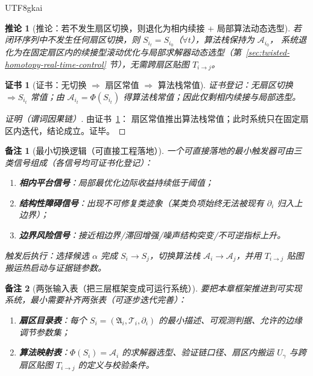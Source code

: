 \documentclass[12pt]{article}
\newtheorem{corollary}{推论}[section]
\newtheorem{remark}{备注}[section]
\newtheorem{Certificate}{证书}[section]
\begin{document}
\begin{CJK*}{UTF8}{gkai}
\begin{corollary}[推论：若不发生扇区切换，则退化为相内续接 + 局部算法动态选型]
\label{cor:no-sector-switch-reduces-to-intra-sector}
若闭环序列中不发生任何扇区切换，则 $S_{i_t}=S_{i_0}$（$\forall t$），算法栈保持为 $\mathcal{A}_{i_0}$，
系统退化为在固定扇区内的续接型滚动优化与局部求解器动态选型（第~\ref{sec:twisted-homotopy-real-time-control} 节），无需跨扇区贴图 $T_{i\to j}$。
\end{corollary}

\begin{Certificate}[证书：无切换 $\Rightarrow$ 扇区常值 $\Rightarrow$ 算法栈常值]
\label{cert:no-sector-switch-reduces-to-intra-sector}
证书登记：无扇区切换 $\Rightarrow S_{i_t}$ 常值；由 $\mathcal{A}_{i_t}=\Phi(S_{i_t})$ 得算法栈常值；因此仅剩相内续接与局部选型。
\end{Certificate}

\begin{proof}[证明（谓词因果链）]
由证书~\ref{cert:no-sector-switch-reduces-to-intra-sector}：
扇区常值推出算法栈常值；此时系统只在固定扇区内迭代，结论成立。证毕。
\end{proof}

\begin{remark}[最小切换逻辑（可直接工程落地）]
一个可直接落地的最小触发器可由三类信号组成（各信号均可证书化登记）：
\begin{enumerate}
  \item \textbf{相内平台信号}：局部最优化边际收益持续低于阈值；
  \item \textbf{结构性障碍信号}：出现不可修复类迹象（某类负项始终无法被现有 $\partial_i$ 归入上边界）；
  \item \textbf{边界风险信号}：接近相边界/滞回增强/噪声结构突变/不可逆指标上升。
\end{enumerate}
触发后执行：选择候选 $\alpha$ 完成 $S_i\to S_j$，切换算法栈 $\mathcal{A}_i\to\mathcal{A}_j$，并用 $T_{i\to j}$ 贴图搬运热启动与证据链参数。
\end{remark}

\begin{remark}[两张输入表（把三层框架变成可运行系统）]
要把本章框架推进到可实现系统，最小需要补齐两张表（可逐步迭代完善）：
\begin{enumerate}
  \item \textbf{扇区目录表}：每个 $S_i=(\mathfrak{A}_i,\mathcal{T}_i,\partial_i)$ 的最小描述、可观测判据、允许的边缘调节参数集；
  \item \textbf{算法映射表}：$\Phi(S_i)=\mathcal{A}_i$ 的求解器选型、验证链口径、扇区内搬运 $U_\gamma$ 与跨扇区贴图 $T_{i\to j}$ 的定义与校验条件。
\end{enumerate}
\end{remark}


\end{CJK*}
\end{document}
